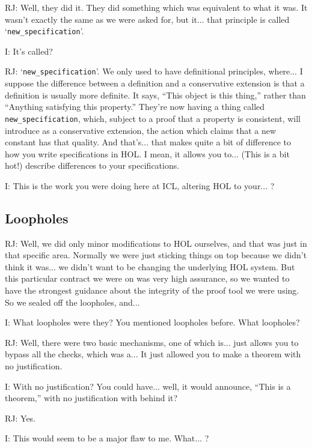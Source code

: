 \documentclass[10pt,titlepage]{book}
\begin{document}
RJ: Well, they did it.
They did something which was equivalent to what it was.
It wasn't exactly the same as we were asked for, but it... that principle is called `{\tt new\_specification}'.

I: It's called?

RJ: `{\tt new\_specification}'.
We only used to have definitional principles, where... I suppose the difference between a definition and a conservative extension is that a definition is usually more definite.
It says, ``This object is this thing,'' rather than ``Anything satisfying this property.''
They're now having a thing called {\tt new\_specification}, which, subject to a proof that a property is consistent, will introduce as a conservative extension, the action which claims that a new constant has that quality.
And that's... that makes quite a bit of difference to how you write specifications in HOL. I mean, it allows you to... (This is a bit hot!) describe differences to your specifications.

I: This is the work you were doing here at ICL, altering HOL to your... ?

\subsection{Loopholes}

RJ: Well, we did only minor modifications to HOL ourselves, and that was just in that specific area. Normally we were just sticking things on top because we didn't think it was... we didn't want to be changing the underlying HOL system. But this particular contract we were on was very high assurance, so we wanted to have the strongest guidance about the integrity of the proof tool we were using. So we sealed off the loopholes, and... 

I: What loopholes were they? You mentioned loopholes before. What loopholes?

RJ: Well, there were two basic mechanisms, one of which is... just allows you to bypass all the checks, which was a... 
It just allowed you to make a theorem with no justification.

I: With no justification?
You could have... well, it would announce, ``This is a theorem,'' with no justification with behind it?

RJ: Yes.

I: This would seem to be a major flaw to me. What... ?
\end{document}
